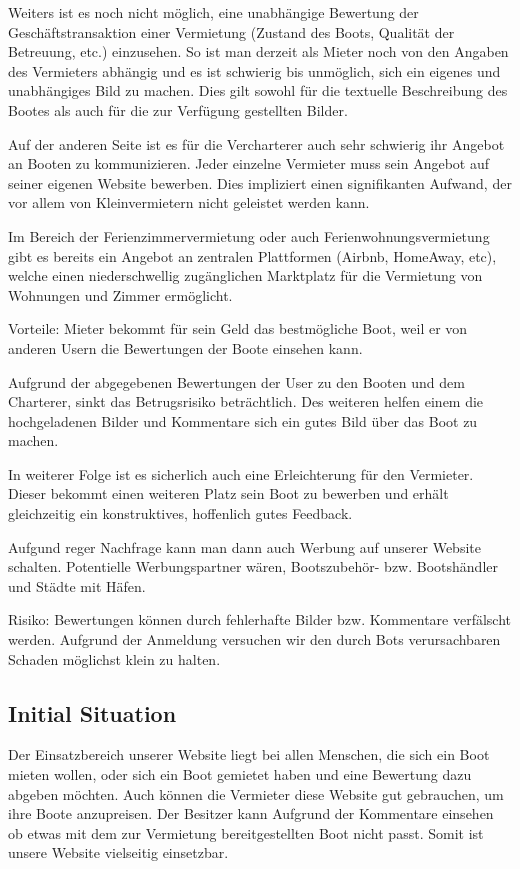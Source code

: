 \documentclass[12pt]{article}
\theoremstyle{definition}
\begin{document}
	Weiters ist es noch nicht möglich, eine unabhängige Bewertung der Geschäfts\-trans\-aktion einer Vermietung (Zustand des Boots, Qualität der Betreuung, etc.) einzusehen. So ist man derzeit als Mieter noch von den Angaben des Vermieters abhängig und es ist schwierig bis unmöglich, sich ein eigenes und unabhängiges Bild zu machen. Dies gilt sowohl für die textuelle Beschreibung des Bootes als auch für die zur Verfügung gestellten Bilder.
	
	Auf der anderen Seite ist es für die Vercharterer auch sehr schwierig ihr Angebot an Booten zu kommunizieren. Jeder einzelne Vermieter muss sein Angebot auf seiner eigenen Website bewerben. Dies impliziert einen signifikanten Aufwand, der vor allem von Kleinvermietern nicht geleistet werden kann.
	
	Im Bereich der Ferienzimmervermietung oder auch Ferienwohnungsvermietung gibt es bereits ein Angebot an zentralen Plattformen (Airbnb, HomeAway, etc), welche einen niederschwellig zugänglichen Marktplatz für die Vermietung von Wohnungen und Zimmer ermöglicht.
	
	Vorteile:
	Mieter bekommt für sein Geld das bestmögliche Boot, weil er von anderen Usern die Bewertungen der Boote einsehen kann.
	
	Aufgrund der abgegebenen Bewertungen der User zu den Booten und dem Charterer, sinkt das Betrugsrisiko beträchtlich. Des weiteren helfen einem die hochgeladenen Bilder und Kommentare sich ein gutes Bild über das Boot zu machen.
	
	In weiterer Folge ist es sicherlich auch eine Erleichterung für den Vermieter. Dieser bekommt einen weiteren Platz sein Boot zu bewerben und erhält gleichzeitig ein konstruktives, hoffenlich gutes Feedback.
	
	Aufgund reger Nachfrage kann man dann auch Werbung auf unserer Website schalten. Potentielle Werbungspartner wären, Bootszubehör- bzw. Bootshändler und Städte mit Häfen.
	
	Risiko:
	Bewertungen können durch fehlerhafte Bilder bzw. Kommentare verfälscht werden. Aufgrund der Anmeldung versuchen wir den durch Bots verursachbaren Schaden möglichst klein zu halten.	

\subsection{Initial Situation}
	Der Einsatzbereich unserer Website liegt bei allen Menschen, die sich ein Boot mieten wollen, oder sich ein Boot gemietet haben und eine Bewertung dazu abgeben möchten.
	Auch können die Vermieter diese Website gut gebrauchen, um ihre Boote anzupreisen.
	Der Besitzer kann Aufgrund der Kommentare einsehen ob etwas mit dem zur Vermietung bereitgestellten Boot nicht passt. Somit ist unsere Website vielseitig einsetzbar.	
\end{document}

